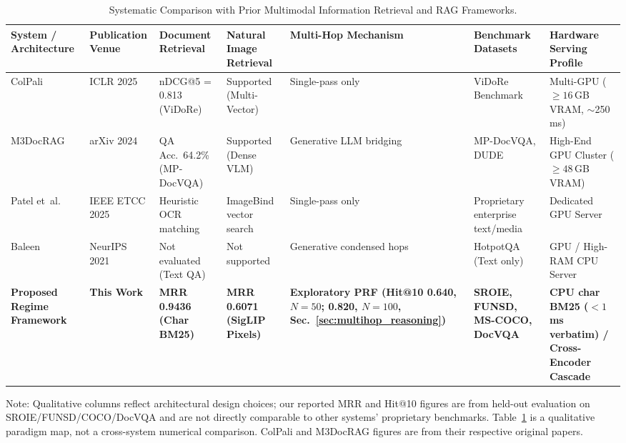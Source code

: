 \begin{table}[t]
\centering
\footnotesize
\setlength{\tabcolsep}{2.5pt}
\caption{Systematic Comparison with Prior Multimodal Information Retrieval and RAG Frameworks.}
\label{tab:sota_comparison}
\begin{tabular}{@{}p{2.2cm}p{1.6cm}p{2.2cm}p{2.0cm}p{2.3cm}p{2.0cm}p{3.6cm}@{}}
\toprule
\textbf{System / Architecture} & \textbf{Publication Venue} & \textbf{Document Retrieval} & \textbf{Natural Image Retrieval} & \textbf{Multi-Hop Mechanism} & \textbf{Benchmark Datasets} & \textbf{Hardware Serving Profile} \\ \midrule
ColPali \cite{faysse2024colpali} & ICLR 2025 & nDCG@5 = 0.813 (ViDoRe) & Supported (Multi-Vector) & Single-pass only & ViDoRe Benchmark & Multi-GPU ($\ge 16$\,GB VRAM, $\sim$250\,ms) \\
M3DocRAG \cite{cho2024m3docrag} & arXiv 2024 & QA Acc.\ 64.2\% (MP-DocVQA) & Supported (Dense VLM) & Generative LLM bridging & MP-DocVQA, DUDE & High-End GPU Cluster ($\ge 48$\,GB VRAM) \\
Patel et~al. \cite{patel2025multimodal} & IEEE ETCC 2025 & Heuristic OCR matching & ImageBind vector search & Single-pass only & Proprietary enterprise text/media & Dedicated GPU Server \\
Baleen \cite{khattab2021baleen} & NeurIPS 2021 & Not evaluated (Text QA) & Not supported & Generative condensed hops & HotpotQA (Text only) & GPU / High-RAM CPU Server \\
\textbf{Proposed Regime Framework} & \textbf{This Work} & \textbf{MRR 0.9436 (Char BM25)} & \textbf{MRR 0.6071 (SigLIP Pixels)} & \textbf{Exploratory PRF (Hit@10 0.640, $N=50$; 0.820, $N=100$, Sec.~\ref{sec:multihop_reasoning})} & \textbf{SROIE, FUNSD, MS-COCO, DocVQA} & \textbf{CPU char BM25 ($<1$\,ms verbatim) / Cross-Encoder Cascade} \\ \bottomrule
\end{tabular}
\vspace{0mm}\newline
\raggedright\scriptsize Note: Qualitative columns reflect architectural design choices; our reported MRR and Hit@10 figures are from held-out evaluation on SROIE/FUNSD/COCO/DocVQA and are not directly comparable to other systems' proprietary benchmarks. Table~\ref{tab:sota_comparison} is a qualitative paradigm map, not a cross-system numerical comparison. ColPali and M3DocRAG figures are from their respective original papers.
\end{table}

